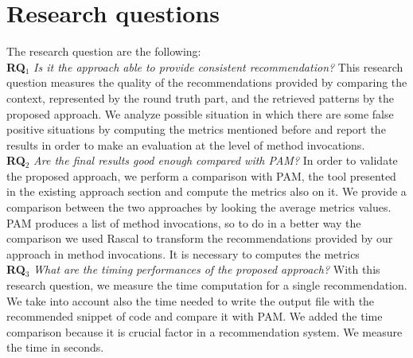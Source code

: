 \section{Research questions}
The research question are the following: \\

\textbf{RQ$_1$} \textit{ Is it the approach able to provide consistent recommendation?}
This research question measures the quality of the recommendations provided by comparing the context, represented by the round truth part, and the retrieved patterns by the proposed approach. We analyze possible situation in which there are some false positive situations by computing the metrics mentioned before and report the results in order to make an evaluation at the level of method invocations.\\
\textbf{RQ$_2$} \textit{Are the final results good enough compared with PAM?} In order to validate the proposed approach, we perform a comparison with PAM, the tool presented in the existing approach section and compute the metrics also on it. We provide a comparison between the two approaches by looking the average metrics values. PAM produces a list of method invocations, so to do in a better way the comparison we used Rascal to transform the recommendations provided by our approach in method invocations. It is necessary to computes the metrics\\

\textbf{RQ$_3$} \textit{What are the timing performances of the proposed approach?} With this research question, we measure the time computation for a single recommendation. We take into account also the time needed to write the output file with the recommended snippet of code and compare it with PAM. We added the time comparison because it is crucial factor in a recommendation system. We measure the time in seconds.\\

